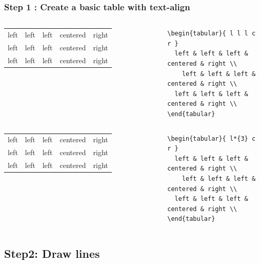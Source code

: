 \documentclass[article]{beamer}
\begin{document}
\begin{frame}[fragile]
\frametitle{Step 1 : Create a basic table with text-align}

\begin{columns}
\tiny{
	\begin{tabular}{ l l l c r }
	  \text left & left & left & centered & right \\
	 	left & left & left & centered & right \\
 	  left & left & left & centered & right \\
	\end{tabular}	
}	
\tiny{
	\begin{verbatim}
\begin{tabular}{ l l l c r }
  left & left & left & centered & right \\
 	left & left & left & centered & right \\
  left & left & left & centered & right \\
\end{tabular}
	\end{verbatim}
} 	
\end{columns}

\begin{columns}
\tiny{
	\begin{tabular}{ l*{3} c r }
	  \text left & left & left & centered & right \\
	 	left & left & left & centered & right \\
 	  left & left & left & centered & right \\
	\end{tabular}	
}	
\tiny{
	\begin{verbatim}
\begin{tabular}{ l*{3} c r }
  left & left & left & centered & right \\
 	left & left & left & centered & right \\
  left & left & left & centered & right \\
\end{tabular}
	\end{verbatim}
} 	
\end{columns}


\end{frame}

\subsection{Step2: Draw lines}
\end{document}
